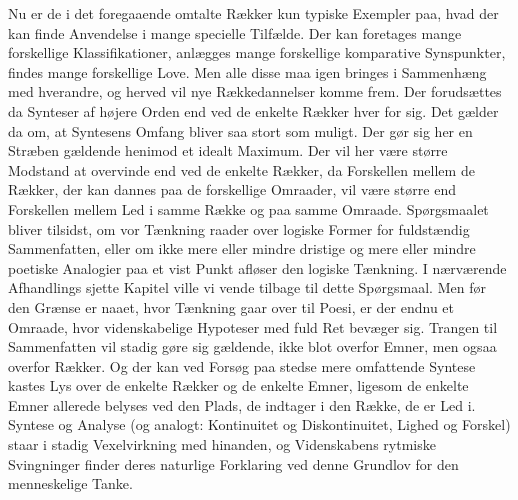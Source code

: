 \documentclass[12pt]{article}
\begin{document}
Nu er de i det foregaaende omtalte Rækker kun typiske Exempler paa, hvad der kan
finde Anvendelse i mange specielle Tilfælde. Der kan foretages mange forskellige
Klassifikationer, anlægges mange forskellige komparative Synspunkter, findes
mange forskellige Love. Men alle disse maa igen bringes i Sammenhæng med
hverandre, og herved vil nye Rækkedannelser komme frem. Der forudsættes da
Synteser af højere Orden end ved de enkelte Rækker hver for sig. Det gælder da
om, at Syntesens Omfang bliver saa stort som muligt. Der gør sig her en Stræben
gældende henimod et idealt Maximum. Der vil her være større Modstand at
overvinde end ved de enkelte Rækker, da Forskellen mellem de Rækker, der kan
dannes paa de forskellige Omraader, vil være større end Forskellen mellem Led i
samme Række og paa samme Omraade. Spørgsmaalet bliver tilsidst, om vor Tænkning
raader over logiske Former for fuldstændig Sammenfatten, eller om ikke mere
eller mindre dristige og mere eller mindre poetiske Analogier paa et vist Punkt
afløser den logiske Tænkning. I nærværende Afhandlings sjette Kapitel ville vi
vende tilbage til dette Spørgsmaal. Men før den Grænse er naaet, hvor Tænkning
gaar over til Poesi, er der endnu et Omraade, hvor videnskabelige Hypoteser med
fuld Ret bevæger sig. Trangen til Sammenfatten vil stadig gøre sig gældende,
ikke blot overfor Emner, men ogsaa overfor Rækker. Og der kan ved Forsøg paa
stedse mere omfattende Syntese kastes Lys over de enkelte Rækker og de enkelte
Emner, ligesom de enkelte Emner allerede belyses ved den Plads, de indtager i den
Række, de er Led i. Syntese og Analyse (og analogt: Kontinuitet og
Diskontinuitet, Lighed og Forskel) staar i stadig Vexelvirkning med hinanden, og
Videnskabens rytmiske Svingninger finder deres naturlige Forklaring ved denne
Grundlov for den menneskelige Tanke.
\end{document}
